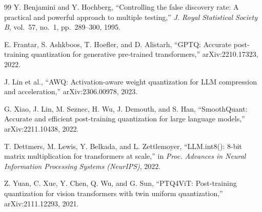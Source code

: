 \documentclass[conference]{IEEEtran}
\begin{document}
\begin{thebibliography}{99}
Y. Benjamini and Y. Hochberg, ``Controlling the false discovery rate: A practical and powerful approach to multiple testing,'' \emph{J. Royal Statistical Society B}, vol.~57, no.~1, pp.~289--300, 1995.


E. Frantar, S. Ashkboos, T. Hoefler, and D. Alistarh, ``GPTQ: Accurate post-training quantization for generative pre-trained transformers,'' arXiv:2210.17323, 2022.

J. Lin et al., ``AWQ: Activation-aware weight quantization for LLM compression and acceleration,'' arXiv:2306.00978, 2023.

G. Xiao, J. Lin, M. Seznec, H. Wu, J. Demouth, and S. Han, ``SmoothQuant: Accurate and efficient post-training quantization for large language models,'' arXiv:2211.10438, 2022.

T. Dettmers, M. Lewis, Y. Belkada, and L. Zettlemoyer, ``LLM.int8(): 8-bit matrix multiplication for transformers at scale,'' in \emph{Proc. Advances in Neural Information Processing Systems (NeurIPS)}, 2022.

Z. Yuan, C. Xue, Y. Chen, Q. Wu, and G. Sun, ``PTQ4ViT: Post-training quantization for vision transformers with twin uniform quantization,'' arXiv:2111.12293, 2021.

\end{thebibliography}
\end{document}
